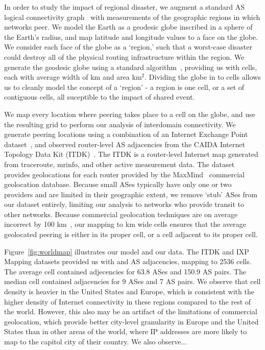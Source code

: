     In order to study the impact of regional disaster, we augment a standard AS logical connectivity graph~\cite{caida-asgraph} with measurements of the geographic regions in which networks peer.
    We model the Earth as a geodesic globe inscribed in a sphere of the Earth's radius, and map latitude and longitude values to a face on the globe.
    We consider each face of the globe as a `region,' such that a worst-case disaster could destroy all of the physical routing infrastructure within the region.
    We generate the geodesic globe using a standard algorithm~\cite{geodesic}, providing us with   cells, each with average width of km and area  km$^2$.  
    Dividing the globe in to cells allows us to cleanly model the concept of a `region' - a region is one cell, or a set of contiguous cells, all suceptible to the impact of shared event. 
     
    We map every location where peering takes place to a cell on the globe, and use the resulting grid to perform our analysis of interdomain connectivity.
    We generate peering locations using a combination of an Internet Exchange Point dataset~\cite{ixps-mapped}, and observed router-level AS adjacencies from the CAIDA Internet Topology Data Kit (ITDK)~\cite{itdk}.
    The ITDK is a router-level Internet map generated from traceroute, mrinfo, and other active measurement data.
    The dataset provides geolocations for each router provided by the MaxMind~\cite{maxmind} commercial geolocation database.
    Because small ASes typically have only one or two providers and are limited in their geographic extent, we remove `stub' ASes from our dataset entirely, limiting our analysis to networks who provide transit to other networks.
    Because commercial geolocation techniques are on average incorrect by 100 km~\cite{someone}, our mapping to  km wide cells ensures that the average geolocated peering is either in its proper cell, or a cell adjacent to its proper cell.
    
    
    Figure~\ref{fig:worldmap} illustrates our model and our data.
    The ITDK and IXP Mapping datasets provided us with  and  AS adjacencies, mapping to 2536 cells.
    The average cell contained adjecencies for 63.8 ASes and 150.9 AS pairs.
    The median cell contained adjacencies for 9 ASes and 7 AS pairs.
    We observe that cell density is heavier in the United States and Europe, which is consistent with the higher density of Internet connectivity in these regions compared to the rest of the world.
    However, this also may be an artifact of the limitations of commercial geolocation, which provide better city-level granularity in Europe and the United States than in other areas of the world, where IP addresses are more likely to map to the capitol city of their country.
    We also observe... 

